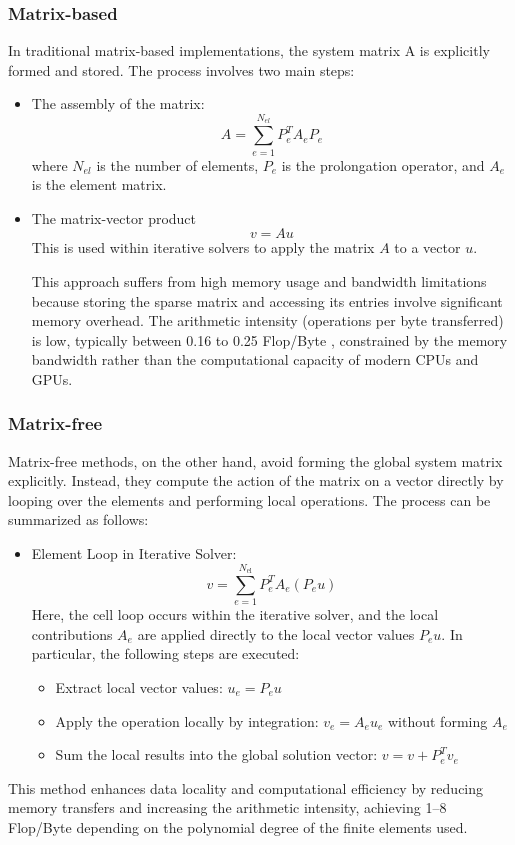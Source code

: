 \documentclass{article}
\begin{document}
\subsubsection{Matrix-based}
In traditional matrix-based implementations, the system matrix A is explicitly formed and stored. The process involves two main steps:
\begin{itemize}
\item The assembly of the matrix:
\begin{equation}
    A = \sum_{e=1}^{N_{el}} P_e^T A_e P_e
    \end{equation}
where $N_{el}$ is the number of elements, $P_e$ is the prolongation operator, and $A_e$ is the element matrix.
\item The matrix-vector product
\begin{equation}
    v = A u
\end{equation}
This is used within iterative solvers to apply the matrix $A$ to a vector $u$.

This approach suffers from high memory usage and bandwidth limitations because storing the sparse matrix and accessing its entries involve significant memory overhead. The arithmetic intensity (operations per byte transferred) is low, typically between 0.16 to 0.25 Flop/Byte \cite{kronbichler2020}, constrained by the memory bandwidth rather than the computational capacity of modern CPUs and GPUs.
\end{itemize}

\subsubsection{Matrix-free}
Matrix-free methods, on the other hand, avoid forming the global system matrix explicitly. Instead, they compute the action of the matrix on a vector directly by looping over the elements and performing local operations. The process can be summarized as follows:
\begin{itemize}
\item Element Loop in Iterative Solver:
\begin{equation}
    v = \sum_{e=1}^{N_{\text{el}}} P_e^T A_e (P_e u)
\end{equation}
Here, the cell loop occurs within the iterative solver, and the local contributions \( A_e \) are applied directly to the local vector values \( P_e u \). In particular, the following steps are executed:
\begin{itemize}
    \item Extract local vector values: \( u_e = P_e u \)
    \item Apply the operation locally by integration: \( v_e = A_e u_e \) without forming \( A_e \)
    \item Sum the local results into the global solution vector: \( v = v + P_e^T v_e \)
\end{itemize}
\end{itemize}
This method enhances data locality and computational efficiency by reducing memory transfers and increasing the arithmetic intensity, achieving 1–8 Flop/Byte \cite{kronbichler2020} depending on the polynomial degree of the finite elements used.
\end{document}
